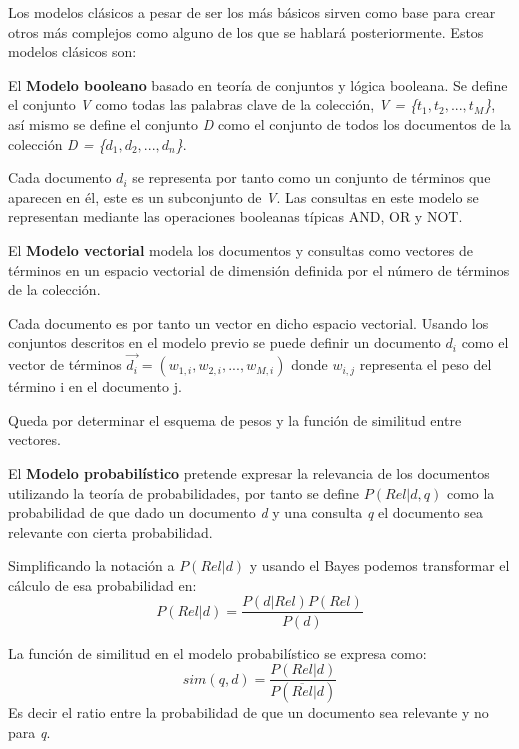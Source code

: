 Los modelos clásicos a pesar de ser los más básicos sirven como base para crear otros más complejos como alguno de los que se hablará posteriormente. Estos modelos clásicos son:\cite{RIspaBook}

\begin{list}{}{}
\item  El \textbf{Modelo booleano} basado en teoría de conjuntos y lógica booleana. Se define el conjunto \textit{V} como todas las palabras clave de la colección, \textit{V = \{\(t_1, t_2, ..., t_M\)\}}, así mismo se define el conjunto \textit{D} como el conjunto de todos los documentos de la colección \textit{D = \{\(d_1, d_2, ..., d_n\)\}}. 

Cada documento \(d_i\) se representa por tanto como un conjunto de términos que aparecen en él, este es un subconjunto de \textit{V}. Las consultas en este modelo se representan mediante las operaciones booleanas típicas AND, OR y NOT.

\item El \textbf{Modelo vectorial} modela los documentos y consultas como vectores de términos en un espacio vectorial de dimensión definida por el número de términos de la colección. 
 
Cada documento es por tanto un vector en dicho espacio vectorial. Usando los conjuntos descritos en el modelo previo se puede definir un documento \(d_i\) como el vector de términos \(\vec{d_i} = (w_{1,i}, w_{2,i}, ..., w_{M,i})\) donde \(w_{i,j}\) representa el peso del término i en el documento j.

Queda por determinar el esquema de pesos y la función de similitud entre vectores.

\item El \textbf{Modelo probabilístico} pretende expresar la relevancia de los documentos utilizando la teoría de probabilidades, por tanto se define \(P(Rel|d, q)\) como la probabilidad de que dado un documento \textit{d} y una consulta \textit{q} el documento sea relevante con cierta probabilidad. 

Simplificando la notación a $P(Rel|d)$ y usando el \gls{Bayes} podemos transformar el cálculo de esa probabilidad en:
\begin{equation}
P(Rel|d) = \frac{P(d|Rel)P(Rel)}{P(d)}
\end{equation}


La función de similitud en el modelo probabilístico se expresa como:
\begin{equation}
sim(q,d) = \frac{P(Rel|d)}{P(\overline{Rel}|d)}
\end{equation}
Es decir el ratio entre la probabilidad de que un documento sea relevante y no para \textit{q}. 


\end{list}
